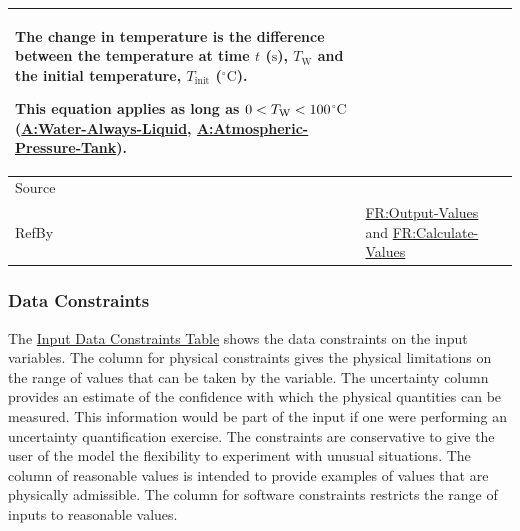 \documentclass[12pt]{article}
\newcommand{\lt}{\ensuremath <}
\begin{document}
\begin{minipage}{\textwidth}
\begin{tabular}{>{\raggedright}p{}>{\raggedright\arraybackslash}p{}}
        The change in temperature is the difference between the temperature at time $t$ (${\text{s}}$), ${T_{\text{W}}}$ and the initial temperature, ${T_{\text{init}}}$ (${{}^{\circ}\text{C}}$).
        
        This equation applies as long as $0\lt{}{T_{\text{W}}}\lt{}100$${{}^{\circ}\text{C}}$ (\hyperref[assumpWAL]{A:Water-Always-Liquid}, \hyperref[assumpAPT]{A:Atmospheric-Pressure-Tank}).
        
\\ \midrule
Source & \cite{koothoor2013}
         
\\ \midrule
RefBy & \hyperref[outputValues]{FR:Output-Values} and \hyperref[calcValues]{FR:Calculate-Values}
        
\\ \bottomrule
\end{tabular}
\end{minipage}

\subsubsection{Data Constraints}
\label{Sec:DataConstraints}
The \hyperref[Table:InDataConstraints]{Input Data Constraints Table} shows the data constraints on the input variables. The column for physical constraints gives the physical limitations on the range of values that can be taken by the variable. The uncertainty column provides an estimate of the confidence with which the physical quantities can be measured. This information would be part of the input if one were performing an uncertainty quantification exercise. The constraints are conservative to give the user of the model the flexibility to experiment with unusual situations. The column of reasonable values is intended to provide examples of values that are physically admissible. The column for software constraints restricts the range of inputs to reasonable values.
\end{document}
